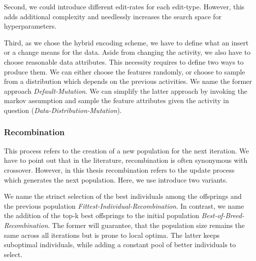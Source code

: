 \documentclass[./../../paper.tex]{subfiles}
\begin{document}
Second, we could introduce different edit-rates for each edit-type. However, this adds additional complexity and needlessly increases the search space for hyperparameters.

Third, as we chose the hybrid encoding scheme, we have to define what an insert or a change means for the data. Aside from changing the activity, we also have to choose reasonable data attributes. This necessity requires to define two ways to produce them. We can either choose the features randomly, or choose to sample from a distribution which depends on the previous activities. We name the former approach \emph{Default-Mutation}. We can simplify the latter approach by invoking the markov assumption and sample the feature attributes given the activity in question (\emph{Data-Distribution-Mutation}).

\subsubsection{Recombination}
This process refers to the creation of a new population for the next iteration. We have to point out that in the literature, recombination is often synonymous with crossover. However, in this thesis recombination refers to the update process which generates the next population. Here, we use introduce two variants.

We name the strinct selection of the best individuals among the offsprings and the previous population \emph{Fittest-Individual-Recombination}. In contrast, we name the addition of the top-k best offsprings to the initial population \emph{Best-of-Breed-Recombination}. The former will guarantee, that the population size remains the same across all iterations but is prone to local optima. The latter keeps suboptimal individuals, while adding a constant pool of better individuals to select.
\end{document}
